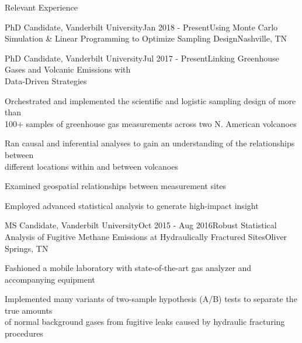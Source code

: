 \documentclass{resume} %
\begin{document}
\begin{rSection}{Relevant Experience}
\begin{rSubsection}{PhD Candidate, Vanderbilt University}{Jan 2018 - Present}{Using Monte Carlo Simulation \& Linear Programming to Optimize Sampling Design}{Nashville, TN}
\end{rSubsection}


\begin{rSubsection}{PhD Candidate, Vanderbilt University}{Jul 2017 - Present}{Linking Greenhouse Gases and Volcanic Emissions with \\ Data-Driven Strategies}{}
\item {Orchestrated and implemented the scientific and logistic sampling design of more than \\ 100+ samples of greenhouse gas measurements across two N. American volcanoes}
\item {Ran causal and inferential analyses to gain an understanding of the relationships between \\ different locations within and between volcanoes}
\item {Examined geospatial relationships between measurement sites}
\item {Employed advanced statistical analysis to generate high-impact insight}

\end{rSubsection}


\begin{rSubsection}{MS Candidate, Vanderbilt University}{Oct 2015 - Aug 2016}{Robust Statistical Analysis of Fugitive Methane Emissions at Hydraulically Fractured Sites}{Oliver Springs, TN}
\item {Fashioned a mobile laboratory with state-of-the-art gas analyzer and accompanying equipment}
\item {Implemented many variants of two-sample hypothesis (A/B) tests to separate the true amounts \\ of normal background gases from fugitive leaks caused by hydraulic fracturing procedures}

\end{rSubsection}


\end{rSection} 

\end{document}
